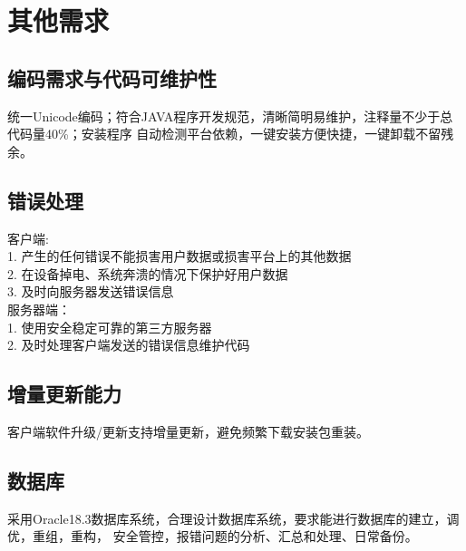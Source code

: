 \chapter{其他需求}
\section{编码需求与代码可维护性}
    统一Unicode编码；符合JAVA程序开发规范，清晰简明易维护，注释量不少于总代码量40\%；安装程序
    自动检测平台依赖，一键安装方便快捷，一键卸载不留残余。
\section{错误处理}
\noindent
    客户端: \\
        1. 产生的任何错误不能损害用户数据或损害平台上的其他数据\\
        2. 在设备掉电、系统奔溃的情况下保护好用户数据\\
        3. 及时向服务器发送错误信息\\
    服务器端：\\
        1. 使用安全稳定可靠的第三方服务器\\
        2. 及时处理客户端发送的错误信息维护代码
\section{增量更新能力}
    客户端软件升级/更新支持增量更新，避免频繁下载安装包重装。
\section{数据库}
    采用Oracle18.3数据库系统，合理设计数据库系统，要求能进行数据库的建立，调优，重组，重构，
    安全管控，报错问题的分析、汇总和处理、日常备份。
